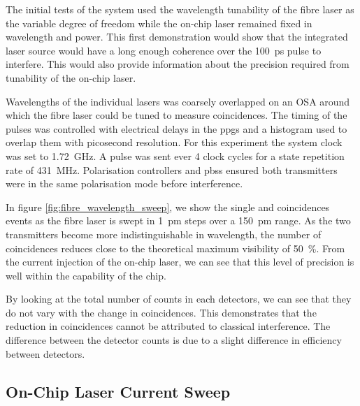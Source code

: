 

The initial tests of the system used the wavelength tunability of the fibre laser as the variable degree of freedom while the on-chip laser remained fixed in wavelength and power. This first demonstration would show that the integrated laser source would have a long enough coherence over the \SI{100}{ps} pulse to interfere. This would also provide information about the precision required from tunability of the on-chip laser. 

Wavelengths of the individual lasers was coarsely overlapped on an \ac{OSA} around which the fibre laser could be tuned to measure coincidences. The timing of the pulses was controlled with electrical delays in the \acp{ppg} and a histogram used to overlap them with picosecond resolution. For this experiment the system clock was set to \SI{1.72}{\GHz}. A pulse was sent ever 4 clock cycles for a state repetition rate of \SI{431}{\MHz}. Polarisation controllers and \acp{pbs} ensured both transmitters were in the same polarisation mode before interference.

In figure \ref{fig:fibre_wavelength_sweep}, we show the single and coincidences events as the fibre laser is swept in \SI{1}{pm} steps over a \SI{150}{pm} range. As the two transmitters become more indistinguishable in wavelength, the number of coincidences reduces close to the theoretical maximum visibility of \SI{50}{\percent}. From the current injection of the on-chip laser, we can see that this level of precision is well within the capability of the chip.

By looking at the total number of counts in each detectors, we can see that they do not vary with the change in coincidences. This demonstrates that the reduction in coincidences cannot be attributed to classical interference. The difference between the detector counts is due to a slight difference in efficiency between detectors.

\subsection{On-Chip Laser Current Sweep}

